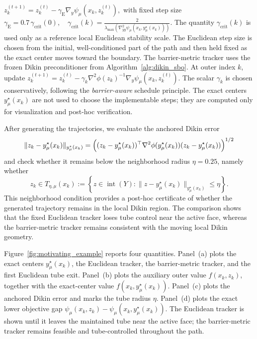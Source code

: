 \documentclass{article}
\begin{document}
\(
z_k^{(t+1)}
=
z_k^{(t)}
-
\gamma_{\mathrm{E}}\nabla_y\psi_\mu(x_k,z_k^{(t)}),
\)
with fixed step size
\(
\gamma_{\mathrm{E}}
=
0.7\,\gamma_{\mathrm{crit}}(0), \quad
\gamma_{\mathrm{crit}}(k)
=
\frac{2}{\lambda_{\max}(\nabla_{yy}^2\psi_\mu(x_k,y_\mu^\star(x_k)))} .
\)
The quantity \(\gamma_{\mathrm{crit}}(k)\) is used only as a reference local Euclidean stability scale.
The Euclidean step size is chosen from the initial, well-conditioned part of the path and then held
fixed as the exact center moves toward the boundary. The barrier-metric tracker uses the frozen Dikin preconditioner from Algorithm~\ref{alg:dikin_sbo}.
At outer index \(k\), update
\(
z_k^{(t+1)}
=
z_k^{(t)}
-
\gamma_k \nabla^2\phi(z_k)^{-1}\nabla_y\psi_\mu(x_k,z_k^{(t)}).
\)
The scalar \(\gamma_k\) is chosen conservatively, following the \textit{barrier-aware} schedule principle.
The exact centers \(y_\mu^\star(x_k)\) are not used to choose the implementable steps; they are
computed only for visualization and post-hoc verification.

After generating the trajectories, we evaluate the anchored Dikin error
\[
\|z_k-y_\mu^\star(x_k)\|_{y_\mu^\star(x_k)}
=
\Bigl(
(z_k-y_\mu^\star(x_k))^\top
\nabla^2\phi(y_\mu^\star(x_k))
(z_k-y_\mu^\star(x_k))
\Bigr)^{1/2}
\]
and check whether it remains below the neighborhood radius \(\eta=0.25\), namely whether
\[
z_k\in
T_{\eta,\mu}(x_k)
:=
\left\{
z\in\operatorname{int}(Y):
\|z-y_\mu^\star(x_k)\|_{y_\mu^\star(x_k)}\le\eta
\right\}.
\]
This neighborhood condition provides a post-hoc certificate of whether the generated trajectory remains in
the local Dikin region. The comparison shows that the fixed Euclidean tracker loses tube control near
the active face, whereas the barrier-metric tracker remains consistent with the moving local Dikin
geometry.

Figure~\ref{fig:motivating_example} reports four quantities. Panel~(a) plots the exact centers
\(y_\mu^\star(x_k)\), the Euclidean tracker, the barrier-metric tracker, and the first Euclidean tube
exit. Panel~(b) plots the auxiliary outer value \(f(x_k,z_k)\), together with the exact-center value
\(f(x_k,y_\mu^\star(x_k))\). Panel~(c) plots the anchored Dikin error and marks the tube radius
\(\eta\). Panel~(d) plots the exact lower objective gap
\(\psi_\mu(x_k,z_k)-\psi_\mu(x_k,y_\mu^\star(x_k))\).
The Euclidean tracker is shown until it leaves the maintained tube near the active face; the
barrier-metric tracker remains feasible and tube-controlled throughout the path.
\end{document}
